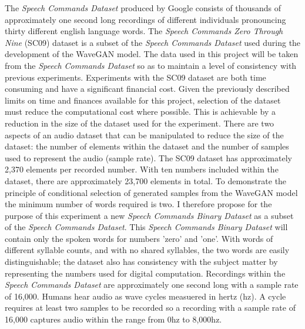 \documentclass[a4paper, dvipsnames, titlepage]{article}
\begin{document}
The \textit{Speech Commands Dataset} \citep{speechcommands} produced by Google consists of thousands of approximately one second long recordings of different individuals pronouncing thirty different english language words.
The \textit{Speech Commands Zero Through Nine} (SC09) dataset is a subset of the \textit{Speech Commands Dataset} used during the development of the WaveGAN model.
The data used in this project will be taken from the \textit{Speech Commands Dataset} so as to maintain a level of consistency with previous experiments.
\newline
\newline
Experiments with the SC09 dataset are both time consuming and have a significant financial cost.
Given the previously described limits on time and finances available for this project, selection of the dataset must reduce the computational cost where possible.
This is achievable by a reduction in the size of the dataset used for the experiment.
There are two aspects of an audio dataset that can be manipulated to reduce the size of the dataset: the number of elements within the dataset and the number of samples used to represent the audio (sample rate).
\newline
\newline
The SC09 dataset has approximately 2,370 elements per recorded number.
With ten numbers included within the dataset, there are approximately 23,700 elements in total.
To demonstrate the principle of conditional selection of generated samples from the WaveGAN model the minimum number of words required is two.
I therefore propose for the purpose of this experiment a new \textit{Speech Commands Binary Dataset} as a subset of the \textit{Speech Commands Dataset}.
\newline
\newline
This \textit{Speech Commands Binary Dataset} will contain only the spoken words for numbers 'zero' and 'one'.
With words of different syllable counts, and with no shared syllables, the two words are easily distinguishable; the dataset also has consistency with the subject matter by representing the numbers used for digital computation.
\newline
\newline
Recordings within the \textit{Speech Commands Dataset} are approximately one second long with a sample rate of 16,000.
Humans hear audio as wave cycles measuered in hertz (hz).
A cycle requires at least two samples to be recorded so a recording with a sample rate of 16,000 captures audio within the range from 0hz to 8,000hz.
\end{document}
